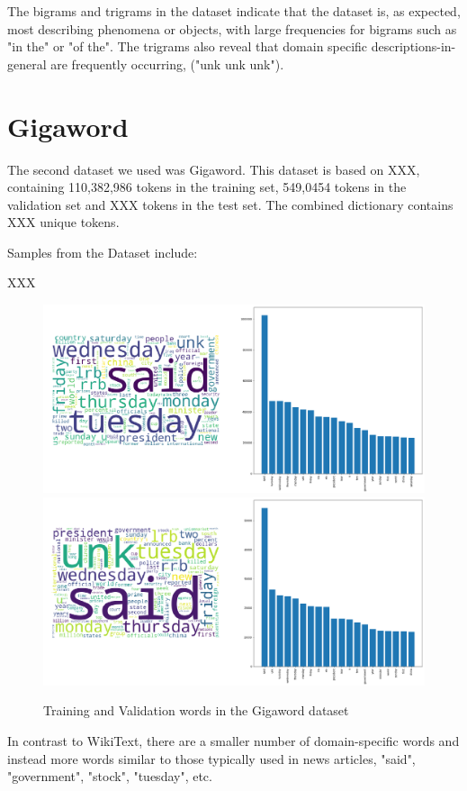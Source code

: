 \documentclass[a4paper]{article}
\begin{document}
The bigrams and trigrams in the dataset indicate that the dataset is, as expected,
most describing phenomena or objects, with large frequencies for bigrams
such as "in the" or "of the". The trigrams also reveal that domain specific
descriptions-in-general are frequently occurring, ("unk unk unk").

\section{Gigaword}
\label{sec:gigaword}

The second dataset we used was Gigaword. This dataset is based on XXX,
containing 110,382,986 tokens in the training set, 549,0454 tokens in the
validation set and XXX tokens in the test set. The combined dictionary
contains XXX unique tokens.

Samples from the Dataset include:

XXX

\begin{figure}[!ht]
\includegraphics[width=0.7\columnwidth]{sr-eda-gigaword-train-words}
\includegraphics[width=0.7\columnwidth]{sr-eda-gigaword-valid-words}
\centering
\caption{Training and Validation words in the Gigaword dataset}
\end{figure}

In contrast to WikiText, there are a smaller number of domain-specific
words and instead more words similar to those typically used in news
articles, "said", "government", "stock", "tuesday", etc.
\end{document}
